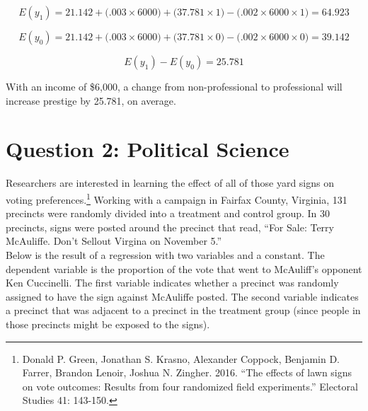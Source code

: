 \documentclass[12pt,letterpaper]{article}
\begin{document}
\begin{enumerate}
	$$E(y_1)= 21.142 + \text{(.003} \times \text{6000)}+ \text{(37.781} \times \text{1)}- \text{(.002}\times \text{6000}\times \text{1)} = 64.923$$
	
	$$E(y_0)= 21.142 + \text{(.003} \times \text{6000)}+ \text{(37.781} \times \text{0)}- \text{(.002}\times \text{6000}\times \text{0)} = 39.142$$
	
	$$E(y_1) - E(y_0) = 25.781$$
	
	
	With an income of \$6,000, a change from non-professional to professional will increase prestige by 25.781, on average.
	
	
\end{enumerate}

\newpage

\section*{Question 2: Political Science}
\vspace{.25cm}
\noindent 	Researchers are interested in learning the effect of all of those yard signs on voting preferences.\footnote{Donald P. Green, Jonathan	S. Krasno, Alexander Coppock, Benjamin D. Farrer,	Brandon Lenoir, Joshua N. Zingher. 2016. ``The effects of lawn signs on vote outcomes: Results from four randomized field experiments.'' Electoral Studies 41: 143-150. } Working with a campaign in Fairfax County, Virginia, 131 precincts were randomly divided into a treatment and control group. In 30 precincts, signs were posted around the precinct that read, ``For Sale: Terry McAuliffe. Don't Sellout Virgina on November 5.'' \\

Below is the result of a regression with two variables and a constant.  The dependent variable is the proportion of the vote that went to McAuliff's opponent Ken Cuccinelli. The first variable indicates whether a precinct was randomly assigned to have the sign against McAuliffe posted. The second variable indicates
a precinct that was adjacent to a precinct in the treatment group (since people in those precincts might be exposed to the signs).  \\
\end{document}
